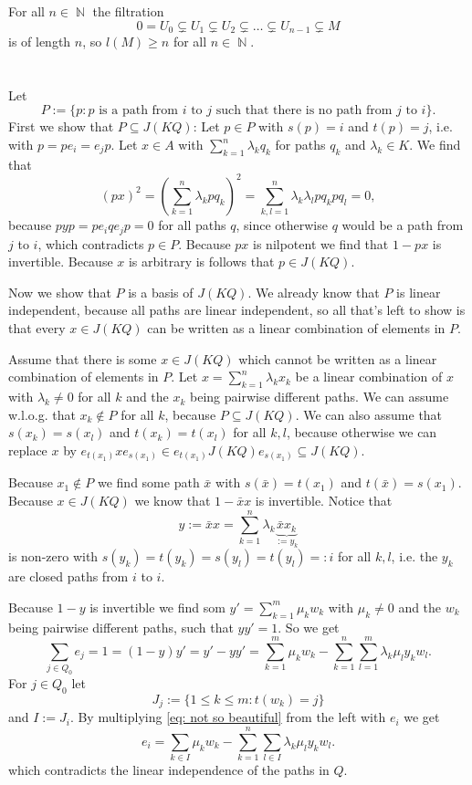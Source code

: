 \documentclass[a4paper,10pt]{article}
\theoremstyle{definition}
\newcommand{\N}{\operatorname{\mathbb{N}}}
\begin{document}
For all $n \in \N$ the filtration
\[
 0 = U_0 \subsetneq U_1 \subsetneq U_2 \subsetneq \ldots \subsetneq U_{n-1} \subsetneq M
\]
is of length $n$, so $l(M) \geq n$ for all $n \in \N$.





\addtocounter{section}{1}
\section{}
Let
\[
 P := \{p : \text{$p$ is a path from $i$ to $j$ such that there is no path from $j$ to $i$}\}.
\]
First we show that $P \subseteq J(KQ)$: Let $p \in P$ with $s(p) = i$ and $t(p)=j$, i.e. with $p = p e_i = e_j p$. Let $x \in A$ with $\sum_{k=1}^n \lambda_k q_k$ for paths $q_k$ and $\lambda_k \in K$. We find that
\[
 (px)^2
 = \left( \sum_{k=1}^n \lambda_k p q_k \right)^2
 = \sum_{k,l=1}^n \lambda_k \lambda_l p q_k p q_l
 = 0,
\]
because $pyp = p e_i q e_j p = 0$ for all paths $q$, since otherwise $q$ would be a path from $j$ to $i$, which contradicts $p \in P$. Because $px$ is nilpotent we find that $1-px$ is invertible. Because $x$ is arbitrary is follows that $p \in J(KQ)$.

Now we show that $P$ is a basis of $J(KQ)$. We already know that $P$ is linear independent, because all paths are linear independent, so all that's left to show is that every $x \in J(KQ)$ can be written as a linear combination of elements in $P$.

Assume that there is some $x \in J(KQ)$ which cannot be written as a linear combination of elements in $P$. Let $x = \sum_{k=1}^n \lambda_k x_k$ be a linear combination of $x$ with $\lambda_k \neq 0$ for all $k$ and the $x_k$ being pairwise different paths. We can assume w.l.o.g. that $x_k \not\in P$ for all $k$, because $P \subseteq J(KQ)$. We can also assume that $s(x_k) = s(x_l)$ and $t(x_k) = t(x_l)$ for all $k,l$, because otherwise we can replace $x$ by $e_{t(x_1)} x e_{s(x_1)} \in e_{t(x_1)} J(KQ) e_{s(x_1)} \subseteq J(KQ)$.

Because $x_1 \not\in P$ we find some path $\bar{x}$ with $s(\bar{x}) = t(x_1)$ and $t(\bar{x}) = s(x_1)$. Because $x \in J(KQ)$ we know that $1-\bar{x}x$ is invertible. Notice that
\[
 y := \bar{x}{x} = \sum_{k=1}^n \lambda_k \underbrace{\bar{x} x_k}_{:= y_k}
\]
is non-zero with $s(y_k) = t(y_k) = s(y_l) = t(y_l) =: i$ for all $k,l$, i.e. the $y_k$ are closed paths from $i$ to $i$.

Because $1-y$ is invertible we find som $y' = \sum_{k=1}^m \mu_k w_k$ with $\mu_k \neq 0$ and the $w_k$ being pairwise different paths, such that $yy' = 1$. So we get
\begin{equation}\label{eq: not so beautiful}
 \sum_{j \in Q_0} e_j
 = 1
 = (1-y) y'
 = y' - yy'
 = \sum_{k=1}^m \mu_k w_k - \sum_{k=1}^n \sum_{l=1}^m \lambda_k \mu_l y_k w_l.
\end{equation}
For $j \in Q_0$ let
\[
 J_j := \{1 \leq k \leq m: t(w_k) = j\}
\]
and $I := J_i$. By multiplying \eqref{eq: not so beautiful} from the left with $e_i$ we get
\[
 e_i = \sum_{k \in I} \mu_k w_k - \sum_{k=1}^n \sum_{l \in I} \lambda_k \mu_l y_k w_l.
\]
which contradicts the linear independence of the paths in $Q$.
\end{document}
